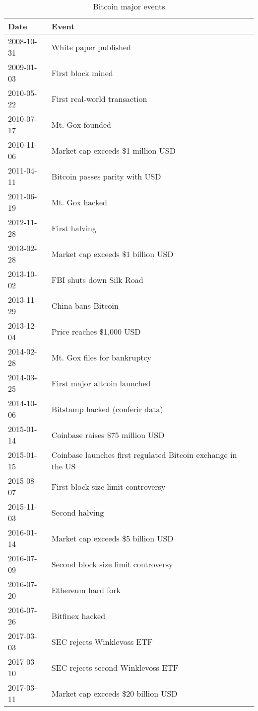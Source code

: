 \begin{table}[h]
\centering
\caption{Bitcoin major events}
\label{tab:my-table}
\begin{tabular}{|l|l|}
\hline
Date       & Event
\\ \hline
2008-10-31 & White paper published
\\ \hline
2009-01-03 & First block mined
\\ \hline
2010-05-22 & First real-world transaction
\\ \hline
2010-07-17 & Mt. Gox founded
\\ \hline
2010-11-06 & Market cap exceeds \$1 million USD
\\ \hline
2011-04-11 & Bitcoin passes parity with USD
\\ \hline
2011-06-19 & Mt. Gox hacked
\\ \hline
2012-11-28 & First halving
\\ \hline
2013-02-28 & Market cap exceeds \$1 billion USD
\\ \hline
2013-10-02 & FBI shuts down Silk Road
\\ \hline
2013-11-29 & China bans Bitcoin
\\ \hline
2013-12-04 & Price reaches \$1,000 USD
\\ \hline
2014-02-28 & Mt. Gox files for bankruptcy
\\ \hline
2014-03-25 & First major altcoin launched
\\ \hline
2014-10-06 & Bitstamp hacked (conferir data)
\\ \hline
2015-01-14 & Coinbase raises \$75 million USD  
\\ \hline
2015-01-15 & Coinbase launches first regulated Bitcoin exchange in the US
\\ \hline
2015-08-07 & First block size limit controversy
\\ \hline
2015-11-03 & Second halving
\\ \hline
2016-01-14 & Market cap exceeds \$5 billion USD
\\ \hline
2016-07-09 & Second block size limit controversy
\\ \hline
2016-07-20 & Ethereum hard fork
\\ \hline
2016-07-26 & Bitfinex hacked
\\ \hline
2017-03-03 & SEC rejects Winklevoss ETF
\\ \hline
2017-03-10 & SEC rejects second Winklevoss ETF
\\ \hline
2017-03-11 & Market cap exceeds \$20 billion USD

\end{tabular}
\end{table}
